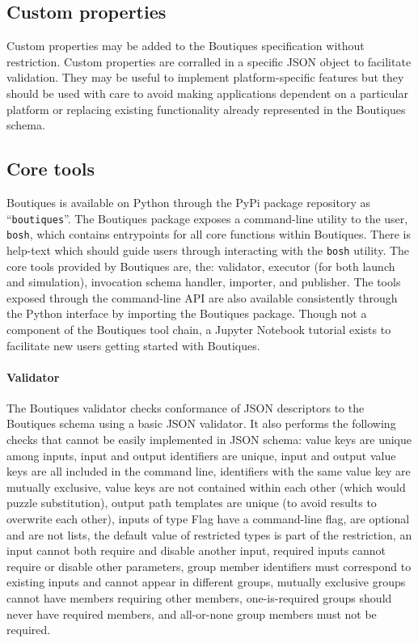 \documentclass[a4paper,num-refs]{oup-contemporary}
\newcommand{\boutiques}{Boutiques\xspace}
\begin{document}
\subsection{Custom properties}

Custom properties may be added to the Boutiques specification without
restriction. Custom properties are corralled in a specific JSON object
to facilitate validation. They may be useful to implement
platform-specific features but they should be used with care to avoid
making applications dependent on a particular platform or replacing
existing functionality already represented in the \boutiques schema.

\subsection{Core tools} 

\boutiques is available on Python through the PyPi package repository
as ``\texttt{boutiques}''. The \boutiques package exposes a
command-line utility to the user, \texttt{bosh}, which contains
entrypoints for all core functions within \boutiques. There is
help-text which should guide users through interacting with the
\texttt{bosh} utility. The core tools provided by \boutiques are, the:
validator, executor (for both launch and simulation), invocation
schema handler, importer, and publisher. The tools exposed through the
command-line API are also available consistently through the Python
interface by importing the \boutiques package. Though not a component
of the \boutiques tool chain, a Jupyter Notebook tutorial exists to
facilitate new users getting started with \boutiques.

\paragraph{Validator} The \boutiques validator checks conformance of JSON
descriptors to the \boutiques schema using a basic JSON validator. It
also performs the following checks that cannot be easily implemented
in JSON schema: value keys are unique among inputs, input and output
identifiers are unique, input and output value keys are all included
in the command line, identifiers with the same value key are mutually
exclusive, value keys are not contained within each other (which would
puzzle substitution), output path templates are unique (to avoid
results to overwrite each other), inputs of type Flag have a
command-line flag, are optional and are not lists, the default value
of restricted types is part of the restriction, an input cannot both
require and disable another input, required inputs cannot require or
disable other parameters, group member identifiers must correspond to
existing inputs and cannot appear in different groups, mutually
exclusive groups cannot have members requiring other members,
one-is-required groups should never have required members, and
all-or-none group members must not be required.
\end{document}
